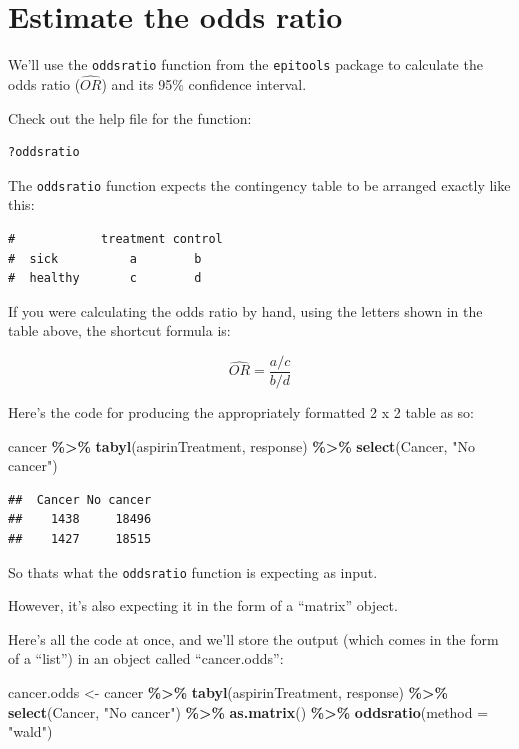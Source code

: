 \documentclass[
]{book}
\newenvironment{Shaded}{\begin{snugshade}}{\end{snugshade}}
\newcommand{\AttributeTok}[1]{\textcolor[rgb]{0.13,0.29,0.53}{#1}}
\newcommand{\FunctionTok}[1]{\textcolor[rgb]{0.13,0.29,0.53}{\textbf{#1}}}
\newcommand{\NormalTok}[1]{#1}
\newcommand{\OtherTok}[1]{\textcolor[rgb]{0.56,0.35,0.01}{#1}}
\newcommand{\SpecialCharTok}[1]{\textcolor[rgb]{0.81,0.36,0.00}{\textbf{#1}}}
\newcommand{\StringTok}[1]{\textcolor[rgb]{0.31,0.60,0.02}{#1}}
\begin{document}
\section{Estimate the odds ratio}\label{oddsratio}

We'll use the \texttt{oddsratio} function from the \texttt{epitools} package to calculate the odds ratio (\(\hat{OR}\)) and its 95\% confidence interval.

Check out the help file for the function:

\begin{verbatim}
?oddsratio
\end{verbatim}

The \texttt{oddsratio} function expects the contingency table to be arranged exactly like this:

\begin{verbatim}
#            treatment control
#  sick          a        b
#  healthy       c        d
\end{verbatim}

If you were calculating the odds ratio by hand, using the letters shown in the table above, the shortcut formula is:

\[\hat{OR} = \frac{{a/c}}{{b/d}}\]

Here's the code for producing the appropriately formatted 2 x 2 table as so:

\begin{Shaded}
\begin{Highlighting}[]
\NormalTok{cancer }\SpecialCharTok{\%\textgreater{}\%}
  \FunctionTok{tabyl}\NormalTok{(aspirinTreatment, response) }\SpecialCharTok{\%\textgreater{}\%}
    \FunctionTok{select}\NormalTok{(Cancer, }\StringTok{"No cancer"}\NormalTok{)}
\end{Highlighting}
\end{Shaded}

\begin{verbatim}
##  Cancer No cancer
##    1438     18496
##    1427     18515
\end{verbatim}

So thats what the \texttt{oddsratio} function is expecting as input.

However, it's also expecting it in the form of a ``matrix'' object.

Here's all the code at once, and we'll store the output (which comes in the form of a ``list'') in an object called ``cancer.odds'':

\begin{Shaded}
\begin{Highlighting}[]
\NormalTok{cancer.odds }\OtherTok{\textless{}{-}}\NormalTok{ cancer }\SpecialCharTok{\%\textgreater{}\%}
  \FunctionTok{tabyl}\NormalTok{(aspirinTreatment, response) }\SpecialCharTok{\%\textgreater{}\%}
    \FunctionTok{select}\NormalTok{(Cancer, }\StringTok{"No cancer"}\NormalTok{) }\SpecialCharTok{\%\textgreater{}\%}
    \FunctionTok{as.matrix}\NormalTok{() }\SpecialCharTok{\%\textgreater{}\%}
    \FunctionTok{oddsratio}\NormalTok{(}\AttributeTok{method =} \StringTok{"wald"}\NormalTok{)}
\end{Highlighting}
\end{Shaded}
\end{document}
